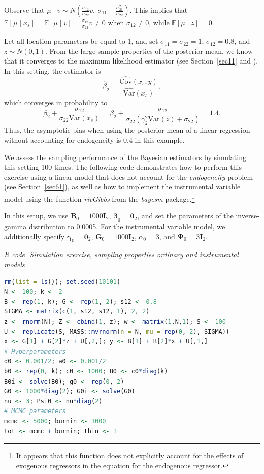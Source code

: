 Observe that $\mu \mid v \sim N\left(\frac{\sigma_{12}}{\sigma_{22}}v,\ \sigma_{11} - \frac{\sigma_{21}^2}{\sigma_{22}}\right)$. This implies that $\mathbb{E}[\mu \mid x_s] = \mathbb{E}[\mu \mid v] = \frac{\sigma_{12}}{\sigma_{22}}v \neq 0$ when $\sigma_{12} \neq 0$, while $\mathbb{E}[\mu \mid z] = 0$.

Let all location parameters be equal to 1, and set $\sigma_{11} = \sigma_{22} = 1$, $\sigma_{12} = 0.8$, and $z \sim N(0,1)$. From the large-sample properties of the posterior mean, we know that it converges to the maximum likelihood estimator (see Section~\ref{sec11} and \cite{Lehmann2003,van2000asymptotic}). In this setting, the estimator is 
\[
\hat{\beta}_2 = \frac{\widehat{\mathrm{Cov}}(x_s, y)}{\widehat{\mathrm{Var}}(x_s)},
\]
which converges in probability to 
\[
\beta_2 + \frac{\sigma_{12}}{\sigma_{22}\mathrm{Var}(x_s)} 
= \beta_2 + \frac{\sigma_{12}}{\sigma_{22}(\gamma_2^2 \mathrm{Var}(z) + \sigma_{22})} 
= 1.4.
\]
Thus, the asymptotic bias when using the posterior mean of a linear regression without accounting for endogeneity is 0.4 in this example.

We assess the sampling performance of the Bayesian estimators by simulating this setting 100 times. The following code demonstrates how to perform this exercise using a linear model that does not account for the \textit{endogeneity} problem (see Section~\ref{sec61}), as well as how to implement the instrumental variable model using the function \textit{rivGibbs} from the \textit{bayesm} package.\footnote{It appears that this function does not explicitly account for the effects of exogenous regressors in the equation for the endogenous regressor.} 

In this setup, we use \( \bm{B}_0 = 1000 \bm{I}_2 \), \( \bm{\beta}_0 = \bm{0}_2 \), and set the parameters of the inverse-gamma distribution to 0.0005. For the instrumental variable model, we additionally specify \( \bm{\gamma}_0 = \bm{0}_2 \), \( \bm{G}_0 = 1000 \bm{I}_2 \), \( \alpha_0 = 3 \), and \( \bm{\Psi}_0 = 3 \bm{I}_2 \).

\begin{tcolorbox}[enhanced,width=4.67in,center upper,
	fontupper=\large\bfseries,drop shadow southwest,sharp corners]
	\textit{R code. Simulation exercise, sampling properties ordinary and instrumental models}
	\begin{VF}
		\begin{lstlisting}[language=R]
rm(list = ls()); set.seed(10101)
N <- 100; k <- 2
B <- rep(1, k); G <- rep(1, 2); s12 <- 0.8
SIGMA <- matrix(c(1, s12, s12, 1), 2, 2)
z <- rnorm(N); Z <- cbind(1, z); w <- matrix(1,N,1); S <- 100
U <- replicate(S, MASS::mvrnorm(n = N, mu = rep(0, 2), SIGMA))
x <- G[1] + G[2]*z + U[,2,]; y <- B[1] + B[2]*x + U[,1,]
# Hyperparameters
d0 <- 0.001/2; a0 <- 0.001/2
b0 <- rep(0, k); c0 <- 1000; B0 <- c0*diag(k)
B0i <- solve(B0); g0 <- rep(0, 2)
G0 <- 1000*diag(2); G0i <- solve(G0)
nu <- 3; Psi0 <- nu*diag(2)
# MCMC parameters
mcmc <- 5000; burnin <- 1000
tot <- mcmc + burnin; thin <- 1
\end{lstlisting}
	\end{VF}
\end{tcolorbox}

